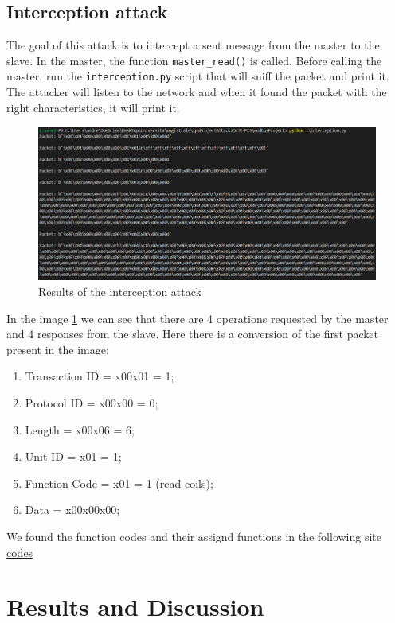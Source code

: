 \documentclass[12pt]{article}
\begin{document}
\subsection{Interception attack}
The goal of this attack is to intercept a sent message from the master to the slave. In the master, the function \texttt{master\_read()} is called. Before calling the master, run the \texttt{interception.py} script that will sniff the packet and print it. The attacker will listen to the network and when it found the packet with the right characteristics, it will print it.
\begin{figure}[h]
    \centering
    \includegraphics[width=1\textwidth]{images/InterceptionResults.png}
    \caption{Results of the interception attack}
    \label{fig:interceptionResult}
\end{figure}
In the image \ref{fig:interceptionResult} we can see that there are 4 operations requested by the master and 4 responses from the slave.
Here there is a conversion of the first packet present in the image:
\begin{enumerate}
    \item Transaction ID = x00x01 = 1;
    \item Protocol ID = x00x00 = 0;
    \item Length = x00x06 = 6;
    \item Unit ID = x01 = 1;
    \item Function Code = x01 = 1 (read coils);
    \item Data = x00x00x00;
\end{enumerate}
We found the function codes and their assignd functions in the following site \href{https://ozeki.hu/p_5873-modbus-function-codes.html}{codes}
\section{Results and Discussion}
\printbibliography 
\end{document}
